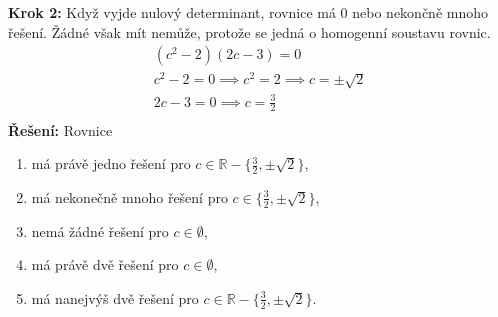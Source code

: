 \textbf{Krok 2:} Když vyjde nulový determinant, rovnice má 0 nebo nekončně mnoho řešení.
Žádné však mít nemůže, protože se jedná o homogenní soustavu rovnic.
\begin{displaymath}
\begin{matrix}
(c^2-2)(2c-3)=0\\
c^2-2=0\implies c^2=2 \implies c=\pm\sqrt{2}\\
2c-3=0\implies c=\frac{3}{2}\\
\end{matrix}
\end{displaymath}
\textbf{Řešení:} Rovnice
\begin{enumerate}[label=\alph*)]
    \item má právě jedno řešení pro $c\in\mathbb{R}\minus\{\frac{3}{2},\pm\sqrt{2}\}$,
    \item má nekonečně mnoho řešení pro $c\in\{\frac{3}{2},\pm\sqrt{2}\}$,
    \item nemá žádné řešení pro $c\in\emptyset$,
    \item má právě dvě řešení pro $c\in\emptyset$,
    \item má nanejvýš dvě řešení pro $c\in\mathbb{R}\minus\{\frac{3}{2},\pm\sqrt{2}\}$.
\end{enumerate}
